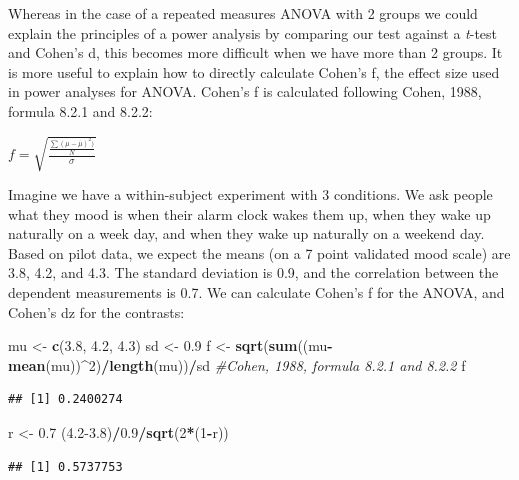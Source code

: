 \documentclass[]{book}
\newenvironment{Shaded}{\begin{snugshade}}{\end{snugshade}}
\newcommand{\CommentTok}[1]{\textcolor[rgb]{0.56,0.35,0.01}{\textit{#1}}}
\newcommand{\DecValTok}[1]{\textcolor[rgb]{0.00,0.00,0.81}{#1}}
\newcommand{\FloatTok}[1]{\textcolor[rgb]{0.00,0.00,0.81}{#1}}
\newcommand{\KeywordTok}[1]{\textcolor[rgb]{0.13,0.29,0.53}{\textbf{#1}}}
\newcommand{\NormalTok}[1]{#1}
\newcommand{\OperatorTok}[1]{\textcolor[rgb]{0.81,0.36,0.00}{\textbf{#1}}}
\newcommand{\StringTok}[1]{\textcolor[rgb]{0.31,0.60,0.02}{#1}}
\begin{document}
Whereas in the case of a repeated measures ANOVA with 2 groups we could explain the principles of a power analysis by comparing our test against a \emph{t}-test and Cohen's d, this becomes more difficult when we have more than 2 groups. It is more useful to explain how to directly calculate Cohen's f, the effect size used in power analyses for ANOVA. Cohen's f is calculated following Cohen, 1988, formula 8.2.1 and 8.2.2:

\(f = \sqrt{\frac{\frac{\sum(\mu-\overline{\mu})^2)}N}\sigma}\)

Imagine we have a within-subject experiment with 3 conditions. We ask people what they mood is when their alarm clock wakes them up, when they wake up naturally on a week day, and when they wake up naturally on a weekend day. Based on pilot data, we expect the means (on a 7 point validated mood scale) are 3.8, 4.2, and 4.3. The standard deviation is 0.9, and the correlation between the dependent measurements is 0.7. We can calculate Cohen's f for the ANOVA, and Cohen's dz for the contrasts:

\begin{Shaded}
\begin{Highlighting}[]
\NormalTok{mu <-}\StringTok{ }\KeywordTok{c}\NormalTok{(}\FloatTok{3.8}\NormalTok{, }\FloatTok{4.2}\NormalTok{, }\FloatTok{4.3}\NormalTok{)}
\NormalTok{sd <-}\StringTok{ }\FloatTok{0.9}
\NormalTok{f <-}\StringTok{ }\KeywordTok{sqrt}\NormalTok{(}\KeywordTok{sum}\NormalTok{((mu}\OperatorTok{-}\KeywordTok{mean}\NormalTok{(mu))}\OperatorTok{^}\DecValTok{2}\NormalTok{)}\OperatorTok{/}\KeywordTok{length}\NormalTok{(mu))}\OperatorTok{/}\NormalTok{sd }\CommentTok{#Cohen, 1988, formula 8.2.1 and 8.2.2}
\NormalTok{f}
\end{Highlighting}
\end{Shaded}

\begin{verbatim}
## [1] 0.2400274
\end{verbatim}

\begin{Shaded}
\begin{Highlighting}[]
\NormalTok{r <-}\StringTok{ }\FloatTok{0.7}
\NormalTok{(}\FloatTok{4.2-3.8}\NormalTok{)}\OperatorTok{/}\FloatTok{0.9}\OperatorTok{/}\KeywordTok{sqrt}\NormalTok{(}\DecValTok{2}\OperatorTok{*}\NormalTok{(}\DecValTok{1}\OperatorTok{-}\NormalTok{r))}
\end{Highlighting}
\end{Shaded}

\begin{verbatim}
## [1] 0.5737753
\end{verbatim}
\end{document}
